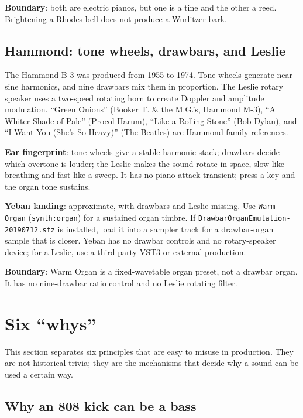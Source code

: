 \textbf{Boundary}: both are electric pianos, but one is a tine and the other
a reed. Brightening a Rhodes bell does not produce a Wurlitzer bark.

\subsection{Hammond: tone wheels, drawbars, and Leslie}
\label{sec:iconic-hammond}

The Hammond B-3 was produced from 1955 to 1974. Tone wheels generate
near-sine harmonics, and nine drawbars mix them in proportion. The Leslie
rotary speaker uses a two-speed rotating horn to create Doppler and amplitude
modulation. ``Green Onions'' (Booker T. \& the M.G.'s, Hammond M-3), ``A
Whiter Shade of Pale'' (Procol Harum), ``Like a Rolling Stone'' (Bob Dylan),
and ``I Want You (She's So Heavy)'' (The Beatles) are Hammond-family
references.

\textbf{Ear fingerprint}: tone wheels give a stable harmonic stack; drawbars
decide which overtone is louder; the Leslie makes the sound rotate in space,
slow like breathing and fast like a sweep. It has no piano attack transient;
press a key and the organ tone sustains.

\begin{sloppypar}
\textbf{Yeban landing}: approximate, with drawbars and Leslie missing. Use
\texttt{Warm Organ} (\texttt{synth:organ}) for a sustained organ timbre. If
\texttt{DrawbarOrganEmulation}\allowbreak\texttt{-20190712.sfz} is installed, load it into a
sampler track for a drawbar-organ sample that is closer. Yeban has no
drawbar controls and no rotary-speaker device; for a Leslie, use a
third-party VST3 or external production.
\end{sloppypar}

\textbf{Boundary}: Warm Organ is a fixed-wavetable organ preset, not a drawbar
organ. It has no nine-drawbar ratio control and no Leslie rotating filter.

\section{Six ``whys''}
\label{sec:iconic-why}

This section separates six principles that are easy to misuse in production.
They are not historical trivia; they are the mechanisms that decide why a
sound can be used a certain way.

\subsection{Why an 808 kick can be a bass}
\label{sec:iconic-why-808}

